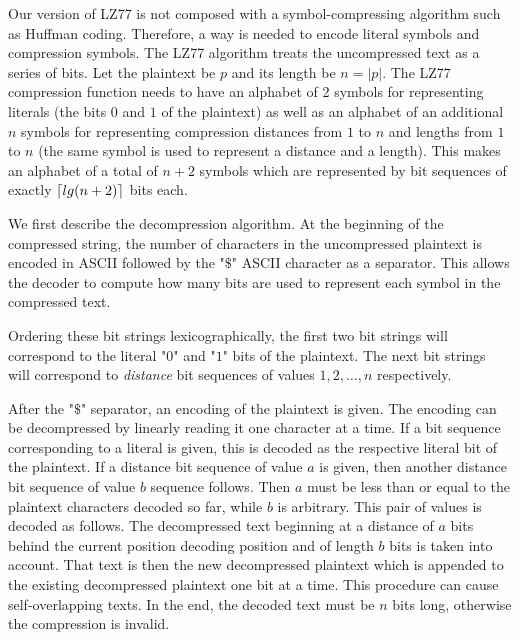 \documentclass{sig-alternate-05-2015}
\DeclarePairedDelimiter{\ceil}{\lceil}{\rceil}
\begin{document}
Our version of LZ77 is not composed with a symbol-compressing algorithm such as
Huffman coding. Therefore, a way is needed to encode literal symbols and
compression symbols. The LZ77 algorithm treats the uncompressed text as a
series of bits. Let the plaintext be $p$ and its length be $n = |p|$. The LZ77
compression function needs to have an alphabet of 2 symbols for representing
literals (the bits $0$ and $1$ of the plaintext) as well as an alphabet of an
additional $n$ symbols for representing compression distances from $1$ to $n$
and lengths from $1$ to $n$ (the same symbol is used to represent a distance
and a length). This makes an alphabet of a total of $n + 2$ symbols which are
represented by bit sequences of exactly $\ceil{lg(n + 2)}$ bits each.

We first describe the decompression algorithm. At the beginning of the
compressed string, the number of characters in the uncompressed plaintext is
encoded in ASCII followed by the "$\$$" ASCII character as a separator. This
allows the decoder to compute how many bits are used to represent each symbol
in the compressed text.

Ordering these bit strings lexicographically, the first two bit strings will
correspond to the literal "$0$" and "$1$" bits of the plaintext. The next bit
strings will correspond to \textit{distance} bit sequences of values $1, 2,
\ldots, n$ respectively.

After the "$\$$" separator, an encoding of the plaintext is given. The encoding
can be decompressed by linearly reading it one character at a time. If a bit
sequence corresponding to a literal is given, this is decoded as the respective
literal bit of the plaintext. If a distance bit sequence of value $a$ is given,
then another distance bit sequence of value $b$ sequence follows.  Then $a$
must be less than or equal to the plaintext characters decoded so far, while
$b$ is arbitrary. This pair of values is decoded as follows. The decompressed
text beginning at a distance of $a$ bits behind the current position decoding
position and of length $b$ bits is taken into account. That text is then the
new decompressed plaintext which is appended to the existing decompressed
plaintext one bit at a time. This procedure can cause self-overlapping texts.
In the end, the decoded text must be $n$ bits long, otherwise the compression
is invalid.
\end{document}
